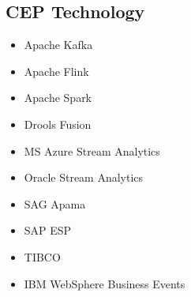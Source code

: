 \subsection{CEP Technology}

\begin{itemize}
    \item Apache Kafka
    \item Apache Flink
    \item Apache Spark
    \item Drools Fusion
    \item MS Azure Stream Analytics
    \item Oracle Stream Analytics
    \item SAG Apama
    \item SAP ESP
    \item TIBCO
    \item IBM WebSphere Business Events
\end{itemize}

